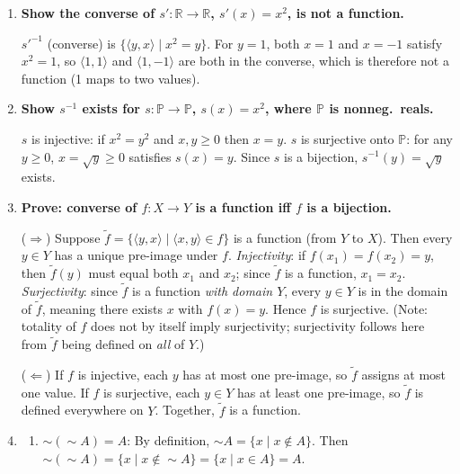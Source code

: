 \documentclass[11pt]{book}
\def\RN{\mathbb{R}}
\def\NNN{\mathbb{P}}
\begin{document}
\begin{enumerate}[{0.}1. ]
\begin{enumerate}
\item Restrict domain to $[-1,1]$ and range to $[0,\pi]$: $t: [-1,1] \to [0,\pi]$, $t(x) = \arccos(x)$, is a valid function.
\end{enumerate}

\item \textbf{Show the converse of $s': \RN \to \RN$, $s'(x)=x^2$, is not a function.}

$s'^{-1}$ (converse) is $\{\langle y, x\rangle \mid x^2 = y\}$. For $y = 1$, both $x=1$ and $x=-1$ satisfy $x^2=1$, so $\langle 1,1\rangle$ and $\langle 1,-1\rangle$ are both in the converse, which is therefore not a function (1 maps to two values).

\item \textbf{Show $s^{-1}$ exists for $s: \NNN \to \NNN$, $s(x)=x^2$, where $\NNN$ is nonneg.\ reals.}

$s$ is injective: if $x^2 = y^2$ and $x,y \geq 0$ then $x = y$. $s$ is surjective onto $\NNN$: for any $y \geq 0$, $x = \sqrt{y} \geq 0$ satisfies $s(x)=y$. Since $s$ is a bijection, $s^{-1}(y) = \sqrt{y}$ exists.

\item \textbf{Prove: converse of $f: X \to Y$ is a function iff $f$ is a bijection.}

($\Rightarrow$) Suppose $\tilde{f} = \{\langle y,x\rangle \mid \langle x,y\rangle \in f\}$ is a function (from $Y$ to $X$). Then every $y \in Y$ has a unique pre-image under $f$. \textit{Injectivity}: if $f(x_1)=f(x_2)=y$, then $\tilde{f}(y)$ must equal both $x_1$ and $x_2$; since $\tilde{f}$ is a function, $x_1=x_2$. \textit{Surjectivity}: since $\tilde{f}$ is a function \emph{with domain $Y$}, every $y \in Y$ is in the domain of $\tilde{f}$, meaning there exists $x$ with $f(x)=y$. Hence $f$ is surjective. (Note: totality of $f$ does not by itself imply surjectivity; surjectivity follows here from $\tilde{f}$ being defined on \emph{all} of $Y$.)

($\Leftarrow$) If $f$ is injective, each $y$ has at most one pre-image, so $\tilde{f}$ assigns at most one value. If $f$ is surjective, each $y \in Y$ has at least one pre-image, so $\tilde{f}$ is defined everywhere on $Y$. Together, $\tilde{f}$ is a function.

\item
\begin{enumerate}
\item $\sim(\sim A)= A$: By definition, $\sim A = \{x \mid x \notin A\}$. Then $\sim(\sim A) = \{x \mid x \notin \sim A\} = \{x \mid x \in A\} = A$.


\end{enumerate}
\end{enumerate}
\end{document}
